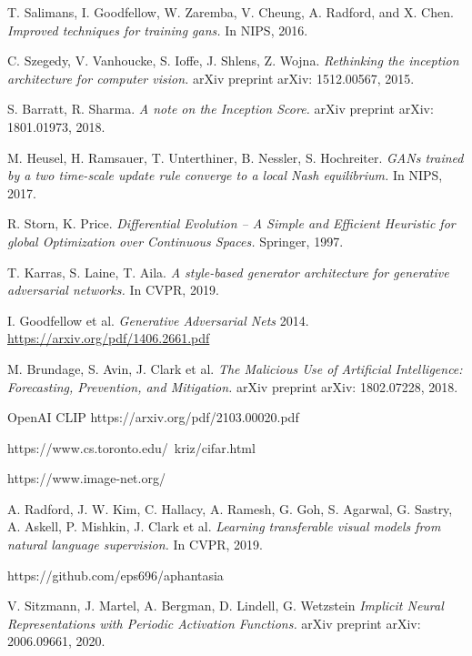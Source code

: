 \documentclass[12pt,a4paper,openany]{book}
\begin{document}
\begin{thebibliography}{a,b,c}
 T. Salimans, I. Goodfellow, W. Zaremba, V. Cheung, A. Radford, and X. Chen. {\it Improved techniques for training gans.} In NIPS, 2016.

 C. Szegedy, V. Vanhoucke, S. Ioffe, J. Shlens, Z. Wojna. {\it Rethinking the inception architecture for computer vision.} arXiv preprint arXiv: 1512.00567, 2015.

 S. Barratt, R. Sharma. {\it A note on the Inception Score.} arXiv preprint arXiv: 1801.01973, 2018.

 M. Heusel, H. Ramsauer, T. Unterthiner, B. Nessler, S. Hochreiter. {\it GANs trained by a two time-scale update rule converge to a local Nash equilibrium.} In NIPS, 2017.

 R. Storn, K. Price. {\it Differential Evolution – A Simple and Efficient Heuristic for global Optimization over Continuous Spaces.} Springer, 1997.

 T. Karras, S. Laine, T. Aila. {\it A style-based generator architecture for generative adversarial networks.} In CVPR, 2019.

 I. Goodfellow et al.  {\it Generative Adversarial Nets} 2014.  \url{https://arxiv.org/pdf/1406.2661.pdf}

 M. Brundage, S. Avin, J. Clark et al. {\it The Malicious Use of Artificial Intelligence: Forecasting, Prevention, and Mitigation.} arXiv preprint arXiv: 1802.07228, 2018.

 OpenAI CLIP https://arxiv.org/pdf/2103.00020.pdf

 https://www.cs.toronto.edu/~kriz/cifar.html

 https://www.image-net.org/

 A. Radford, J. W. Kim, C. Hallacy, A. Ramesh, G. Goh, S. Agarwal, G. Sastry, A. Askell, P. Mishkin, J. Clark et al. {\it Learning transferable visual models
from natural language supervision.} In CVPR, 2019.

 https://github.com/eps696/aphantasia

 V. Sitzmann, J. Martel, A. Bergman, D. Lindell, G. Wetzstein {\it Implicit Neural Representations with Periodic Activation Functions.} arXiv preprint arXiv: 2006.09661, 2020.


\end{thebibliography}
\end{document}
